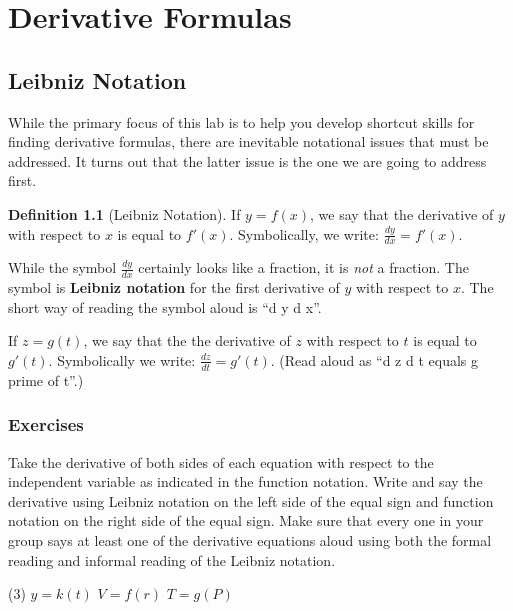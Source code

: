 \documentclass[12pt,]{book}
\newcommand{\terminology}[1]{\textbf{#1}}
\theoremstyle{plain}
\theoremstyle{definition}
\newtheorem{definition}[theorem]{Definition}
\numberwithin{equation}{section}
\newcommand{\fe}[2]{#1\mathopen{}\left(#2\right)\mathclose{}}
\newcommand{\fd}[1]{#1'}
\newcommand{\lz}[2]{\frac{d#1}{d#2}}
\begin{document}
\chapter[Derivative Formulas]{Derivative Formulas}\label{chapter-derivative-formulas}
\typeout{************************************************}
\typeout{************************************************}
\section[Leibniz Notation]{Leibniz Notation}\label{section-leibniz-notation}
While the primary focus of this lab is to help you develop shortcut skills for finding derivative formulas, there are inevitable notational issues that must be addressed.  It turns out that the latter issue is the one we are going to address first.%
\begin{definition}[Leibniz Notation]\label{definition-9}
If \(y=\fe{f}{x}\), we say that the derivative of \(y\) with respect to \(x\) is equal to \(\fe{\fd{f}}{x}\). Symbolically, we write: \(\lz{y}{x}=\fe{\fd{f}}{x}\).%
\par
While the symbol \(\lz{y}{x}\) certainly looks like a fraction, it is \emph{not} a fraction.  The symbol is \terminology{Leibniz notation} for the first derivative of \(y\) with respect to \(x\).  The short way of reading the symbol aloud is ``d y d x''.%
\par
If \(z=\fe{g}{t}\), we say that the the derivative of \(z\) with respect to \(t\) is equal to \(\fe{\fd{g}}{t}\).  Symbolically we write: \(\lz{z}{t}=\fe{\fd{g}}{t}\). (Read aloud as ``d z d t equals g prime of t''.)%
\end{definition}
\typeout{************************************************}
\typeout{************************************************}
\subsection[Exercises]{Exercises}\label{exercises-31}
\hypertarget{exercisegroup-70}{\null}Take the derivative of both sides of each equation with respect to the independent variable as indicated in the function notation.  Write and say the derivative using Leibniz notation on the left side of the equal sign and function notation on the right side of the equal sign.  Make sure that every one in your group says at least one of the derivative equations aloud using both the formal reading and informal reading of the Leibniz notation.%
\par
\begin{exercisegroup}(3)
\exercise[1.]\hypertarget{exercise-345}{\null}\(y=\fe{k}{t}\)%
\exercise[2.]\hypertarget{exercise-346}{\null}\(V=\fe{f}{r}\)%
\exercise[3.]\hypertarget{exercise-347}{\null}\(T=\fe{g}{P}\)%
\end{exercisegroup}
\par\smallskip\noindent
\typeout{************************************************}
\typeout{************************************************}
\end{document}
